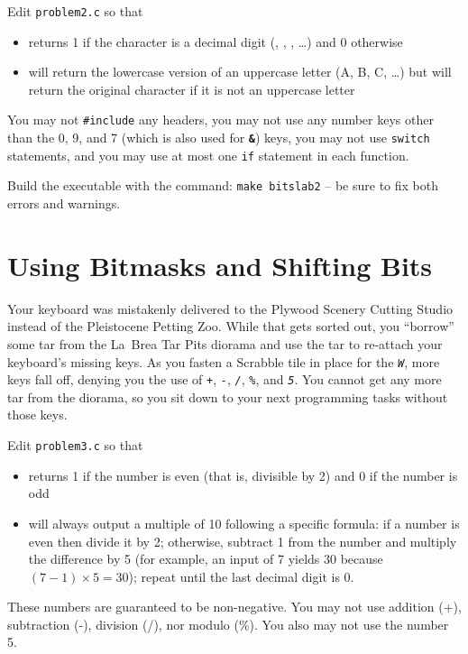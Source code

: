Edit \texttt{problem2.c} so that
\begin{itemize}
\item {} returns 1 if the character is a decimal digit
    (\textquotesingle, \textquotesingle,
    \textquotesingle, \dots) and 0 otherwise
\item {} will return the lowercase version of an
    uppercase letter (\textquotesingle A\textquotesingle, \textquotesingle
    B\textquotesingle, \textquotesingle C\textquotesingle, \dots) but will
    return the original character if it is not an uppercase letter
\end{itemize}
You may not \lstinline{#include} any headers, you may not use any number keys
other than the 0, 9, and 7 (which is also used for \textbf{\texttt{\&}}) keys,
you may not use \lstinline{switch} statements, and you may use at most one
\lstinline{if} statement in each function.

Build the executable with the command: \texttt{make bitslab2} -- be sure to fix
both errors and warnings.


\section{Using Bitmasks and Shifting Bits}

Your keyboard was mistakenly delivered to the Plywood Scenery Cutting Studio
instead of the Pleistocene Petting Zoo. While that gets sorted out, you
``borrow'' some tar from the La~Brea Tar Pits diorama and use the tar to
re-attach your keyboard's missing keys. As you fasten a Scrabble tile in place
for the \textit{\texttt{W}}, more keys fall off, denying you the use of
\textit{\texttt{+}}, \textit{\texttt{-}}, \textit{\texttt{/}},
\textit{\texttt{\%}}, and \textit{\texttt{5}}. You cannot get any more tar
from the diorama, so you sit down to your next programming tasks without those
keys.

Edit \texttt{problem3.c} so that
\begin{itemize}
\item {} returns 1 if the number is even (that is,
    divisible by 2) and 0 if the number is odd
\item {} will always output a multiple of
    10 following a specific formula: if a number is even then divide it by
    2; otherwise, subtract 1 from the number and multiply the difference
    by 5 (for example, an input of 7 yields 30 because $(7-1) \times 5 = 30$);
    repeat until the last decimal digit is 0.
\end{itemize}
These numbers are guaranteed to be non-negative. You may not use addition (+),
subtraction (-), division (/), nor modulo (\%). You also may not use the
number 5.

